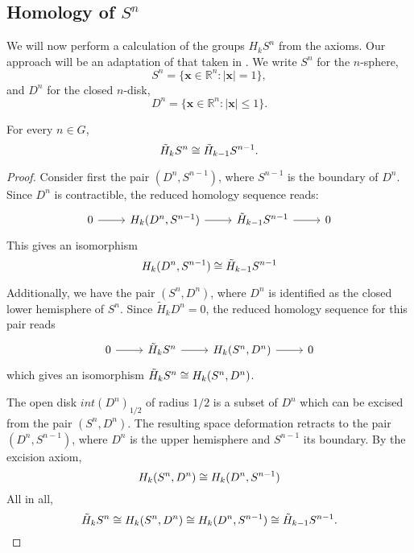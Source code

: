 \subsection{Homology of $S^{n}$}
We will now perform a calculation of the groups $H_kS^{n}$ from the axioms. Our approach will be an adaptation of that taken in \cite{Werndli}. We write $S^n$ for the $n$-sphere, $$S^n=\{\mathbf{x}\in \mathbb{R}^n:|\mathbf{x}|=1\},$$ and $D^n$ for the closed $n$-disk, 
$$D^n=\{\mathbf{x}\in \mathbb{R}^n:|\mathbf{x}|\leq1\}.$$

\begin{lemma}\label{sphere-isomorphism} For every $n\in G$,
$$\tilde{H}_kS^n\cong \tilde{H}_{k-1}S^{n-1}.$$
\end{lemma}
\begin{proof}
Consider first the pair $(D^n,S^{n-1})$, where $S^{n-1}$ is the boundary of $D^n$. Since $D^n$ is contractible, the reduced homology sequence reads:
\[\begin{tikzcd}
 0 \arrow[r] & {H_k(D^n,S^{n-1})} \arrow[r] & \tilde{H}_{k-1}S^{n-1} \arrow[r] & 0 
\end{tikzcd}\]
This gives an isomorphism
$$H_k(D^n,S^{n-1})\cong \tilde{H}_{k-1}S^{n-1}$$

Additionally, we have the pair $(S^n,D^n)$, where $D^n$ is identified as the closed lower hemisphere of $S^n$. Since $\tilde{H}_kD^n=0$, the reduced homology sequence for this pair reads
\[\begin{tikzcd}
0 \arrow[r] & \tilde{H}_kS^n \arrow[r] & {H_k(S^n,D^n)} \arrow[r] & 0
\end{tikzcd}\]
which gives an isomorphism $\tilde{H}_kS^n\cong H_k(S^n,D^n)$.

The open disk $int(D^n)_{1/2}$ of radius $1/2$ is a subset of $D^n$ which can be excised from the pair $(S^n,D^n)$. The resulting space deformation retracts to the pair $(D^n,S^{n-1})$, where $D^n$ is the upper hemisphere and $S^{n-1}$ its boundary. By the excision axiom,
$$H_k (S^n,D^n)\cong H_k(D^n,S^{n-1})$$
All in all,
$$\tilde{H}_kS^n\cong H_k (S^n,D^n)\cong H_k(D^n,S^{n-1})\cong \tilde{H}_{k-1}S^{n-1}.$$


\end{proof}

